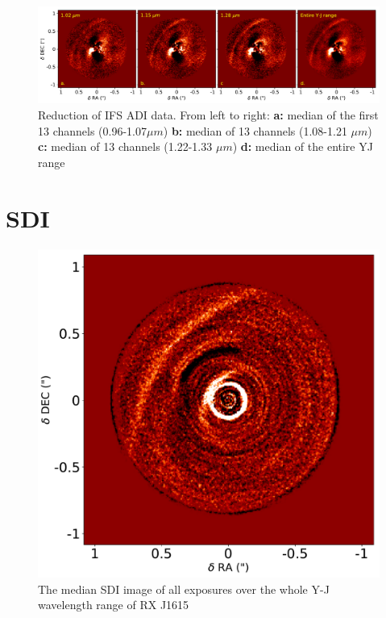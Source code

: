 \documentclass[twoside,single]{lion-msc}
\begin{document}
\begin{figure}[htb]
\centering
\includegraphics[trim={0cm 0cm 0cm 0cm},clip,width = \textwidth]{ADIwavelplot}
\caption{Reduction of IFS ADI data. From left to right: \textbf{a:} median of the first 13 channels (0.96-1.07$\mu m$) \textbf{b:} median of 13 channels (1.08-1.21 $\mu m$) \textbf{c:} median of 13 channels (1.22-1.33 $\mu m$) \textbf{d:} median of the entire YJ range}
\label{fig:ADIcolor}
\end{figure}

\clearpage
\section{SDI}
\begin{figure}
\centering
\includegraphics[width=\linewidth]{SDI_tot}
\caption{The median SDI image of all exposures over the whole Y-J wavelength range of RX J1615}
\label{fig:SDI_tot}
\end{figure}
\end{document}
